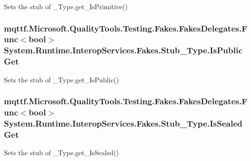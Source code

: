 Sets the stub of \-\_\-\-Type.\-get\-\_\-\-Is\-Primitive()

\hypertarget{class_system_1_1_runtime_1_1_interop_services_1_1_fakes_1_1_stub___type_a671a801a020721f48855c4fe410df346}{
\subsubsection[{Is\-Public\-Get}]{\setlength{\rightskip}{0pt plus 5cm}mqttf.\-Microsoft.\-Quality\-Tools.\-Testing.\-Fakes.\-Fakes\-Delegates.\-Func$<$bool$>$ System.\-Runtime.\-Interop\-Services.\-Fakes.\-Stub\-\_\-\-Type.\-Is\-Public\-Get}}\label{class_system_1_1_runtime_1_1_interop_services_1_1_fakes_1_1_stub___type_a671a801a020721f48855c4fe410df346}


Sets the stub of \-\_\-\-Type.\-get\-\_\-\-Is\-Public()

\hypertarget{class_system_1_1_runtime_1_1_interop_services_1_1_fakes_1_1_stub___type_a7e0ea819e54cd5126a2c8328c485bf66}{
\subsubsection[{Is\-Sealed\-Get}]{\setlength{\rightskip}{0pt plus 5cm}mqttf.\-Microsoft.\-Quality\-Tools.\-Testing.\-Fakes.\-Fakes\-Delegates.\-Func$<$bool$>$ System.\-Runtime.\-Interop\-Services.\-Fakes.\-Stub\-\_\-\-Type.\-Is\-Sealed\-Get}}\label{class_system_1_1_runtime_1_1_interop_services_1_1_fakes_1_1_stub___type_a7e0ea819e54cd5126a2c8328c485bf66}


Sets the stub of \-\_\-\-Type.\-get\-\_\-\-Is\-Sealed()

